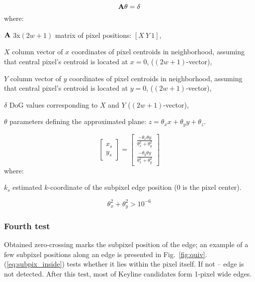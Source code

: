 \begin{equation}
\textbf{A}\theta = \delta
\label{eq:regress}
\end{equation}
where:
\begin{eqwhere}[2cm]
	\item[$\textbf{A}$] 3x$(2w+1)$ matrix of pixel positions: $[X\ Y\ 1]$,
	\item[$X$] column vector of $x$ coordinates of pixel centroids in neighborhood, assuming that central pixel's centroid is located at $x = 0$, ($(2w+1)$-vector),
	\item[$Y$] column vector of $y$ coordinates of pixel centroids in neighborhood, assuming that central pixel's centroid is located at $y = 0$, ($(2w+1)$-vector),
	\item[$\delta$] DoG values corresponding to $X$ and $Y$ ($(2w+1)$-vector),
	\item[$\theta$] parameters defining the approximated plane: $z = \theta_{x}x + \theta_{y}y + \theta_{z}$.
\end{eqwhere}



\begin{equation}
\begin{bmatrix}
x_s \\
y_s 
\end{bmatrix} = 
\begin{bmatrix}
\frac{-\theta_{x} \theta{y}}{\theta_x^2 + \theta_y^2} \\
\frac{-\theta_{y} \theta{y}}{\theta_x^2 + \theta_y^2}
\end{bmatrix}
\label{eq:zerocross}
\end{equation}
where:
\begin{eqwhere}[2cm]
	\item[$k_s$] estimated $k$-coordinate of the subpixel edge position (0 is the pixel center).
\end{eqwhere}

\begin{equation}
\theta_{x}^2 + \theta_{y}^2 > 10^{-6}
\label{eq:test3}
\end{equation}

\subsubsection{Fourth test}
\label{edge_fourth}

Obtained zero-crossing marks the subpixel position of the edge; an example of a few subpixel positions along an edge is presented in Fig.~\ref{fig:quiv}. (\ref{eq:subpix_inside}) tests whether it lies within the pixel itself. If not -- edge is not detected. After this test, most of Keyline candidates form 1-pixel wide edges.

